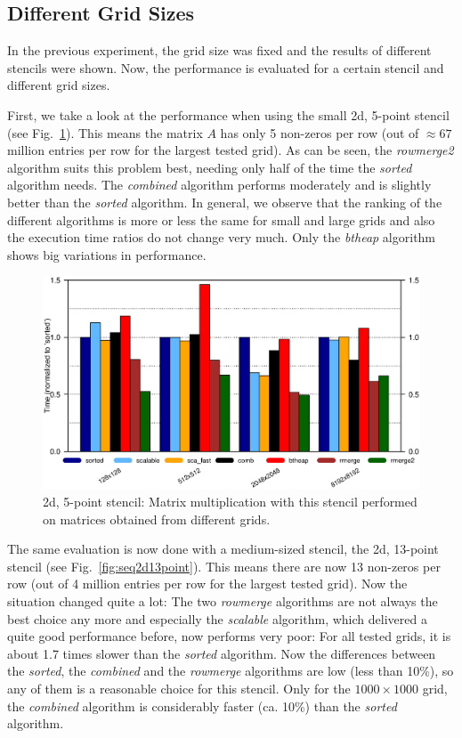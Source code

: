 \subsection{Different Grid Sizes}

In the previous experiment, the grid size was fixed and the results of different stencils were shown. Now, the performance is evaluated for a certain stencil and different grid sizes. 

First, we take a look at the performance when using the small 2d, 5-point stencil (see Fig.~\ref{fig:seq2d5point}). This means the matrix $A$ has only 5 non-zeros per row (out of $\approx 67$ million entries per row for the largest tested grid). As can be seen, the \textit{rowmerge2} algorithm suits this problem best, needing only half of the time the \textit{sorted} algorithm needs. The \textit{combined} algorithm performs moderately and is slightly better than the \textit{sorted} algorithm. In general, we observe that the ranking of the different algorithms is more or less the same for small and large grids and also the execution time ratios do not change very much. Only the \textit{btheap} algorithm shows big variations in performance.

\begin{figure}[tbp]
	\centering
	\hspace*{-7mm}\includegraphics[width=1.05\textwidth, trim={0 6.9cm 0 1cm},clip]{seq_2d5point}
	\caption{2d, 5-point stencil: Matrix multiplication with this stencil performed on matrices obtained from different grids.} 
	\label{fig:seq2d5point}
\end{figure}

The same evaluation is now done with a medium-sized stencil, the 2d, 13-point stencil (see Fig.~\ref{fig:seq2d13point}). This means there are now 13 non-zeros per row (out of 4 million entries per row for the largest tested grid). Now the situation changed quite a lot: The two \textit{rowmerge} algorithms are not always the best choice any more and especially the \textit{scalable} algorithm, which delivered a quite good performance before, now performs very poor: For all tested grids, it is about 1.7 times slower than the \textit{sorted} algorithm. Now the differences between the \textit{sorted}, the \textit{combined} and the \textit{rowmerge} algorithms are low (less than 10\%), so any of them is a reasonable choice for this stencil. Only for the $1000 \times 1000$ grid, the \textit{combined} algorithm is considerably faster (ca. 10\%) than the \textit{sorted} algorithm.

